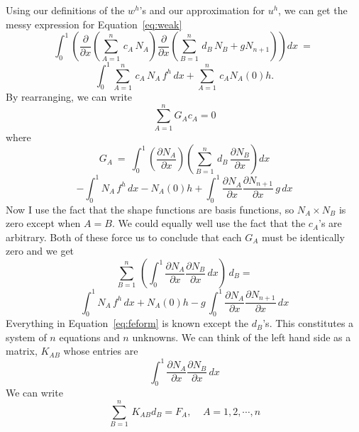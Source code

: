\documentclass{article}
\begin{document}
Using our definitions of the $w^h$'s and our approximation for $u^h$, we can
get the messy expression for Equation~\ref{eq:weak}
\begin{displaymath}
\int_0 ^1 \left ( \frac{\partial}{\partial x} 
\left ( \sum_{A=1}^{n} \, c_A \, N_A \right )
\frac{\partial}{\partial x}  
\left ( \sum_{B=1}^{n} \, d_B \, N_B + g N_{n+1} \right )  \right ) dx ~=~ 
\end{displaymath}
\begin{equation}
\int_0 ^1 \sum_{A=1}^{n} \, c_A \, N_A  \, f^h\, dx + 
\sum_{A=1}^{n} \, c_A N_A (0) h.
\end{equation}
By rearranging, we can write
\begin{equation}
\sum_{A=1}^{n} G_A c_A = 0
\end{equation}
where
\begin{displaymath}
G_A ~=~ \int_0 ^1 \left ( \frac{\partial N_A}{\partial x} \right )
\left ( \sum_{B=1}^{n} \, d_B \, \frac{\partial N_B}{\partial x}  \right ) dx 
\end{displaymath}
\begin{equation}
- \int_0 ^1  N_A  \, f^h\, dx - N_A (0) h + 
\int_0 ^1  \frac{\partial N_A}{\partial x}  \frac{\partial N_{n+1}}{\partial x}
\, g\, dx
\end{equation}
Now I use the fact that the shape functions are basis functions, so 
$N_A \times N_B$ is zero except when $A = B$.  We could equally well use the
fact that the $c_A$'s are arbitrary.   Both of these force us to conclude that
each $G_A$ must be identically zero and we get
\clearpage
\begin{displaymath} 
\sum_{B=1}^{n} \, \left ( \int_0 ^1 \frac{\partial N_A}{\partial x} 
\frac{\partial N_B}{\partial x} \, dx \right ) \, d_B =
\end{displaymath}
\begin{equation}
\int_0 ^1  N_A  \, f^h\, dx + N_A (0) h - 
g\, \int_0 ^1  \frac{\partial N_A}{\partial x}
\frac{\partial N_{n+1}}{\partial x} \, dx \label{eq:feform}
\end{equation}
Everything in Equation~\ref{eq:feform} is known except the $d_B$'s.   This
constitutes a system of $n$ equations and $n$ unknowns.  We can think of the
left hand side as a matrix, $K_{AB}$ whose entries are 
\begin{equation}
\int_0 ^1 \frac{\partial N_A}{\partial x} \frac{\partial N_B}{\partial x} \, dx
\label{eq:Kelements}
\end{equation}
We can write
\begin{equation} 
\sum_{B=1}^{n} \, K_{AB} d_B = F_A, ~~~~~ A = 1, 2, \cdots, n
\end{equation}
\end{document}

